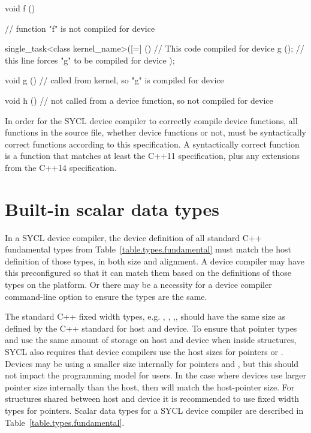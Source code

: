 \begin{code}
void f ()
{
    // function "f" is not compiled for device

    single_task<class kernel_name>([=] ()
        {
            // This code compiled for device
            g (); // this line forces "g" to be compiled for device
        });
}

void g ()
{
    // called from kernel, so "g" is compiled for device
}

void h ()
{
    // not called from a device function, so not compiled for device
}
\end{code}

In order for the SYCL device compiler to correctly compile device functions, all
functions in the source file, whether device functions or not, must be
syntactically correct functions according to this specification. A syntactically
correct function is a function that matches at least the C++11 specification,
plus any extensions from the C++14 specification.

\section{Built-in scalar data types}
\label{subsection:scalartypes}
In a SYCL device compiler, the device definition of all standard C++ fundamental
types from Table~\ref{table.types.fundamental} must match the host definition of those types, in both
size and alignment. A device
compiler may have this preconfigured so that it can match them based on the
definitions of those types on the platform. Or there may be a necessity for a
device compiler command-line option to ensure the types are the same.

The standard C++ fixed width types, e.g. ,
, ,,
should have the same size as defined by the C++ standard for host and
device.
\ifx\showtodos\true
To ensure that pointer types and  use the same amount of
storage on host and device when inside structures, SYCL also requires that
device compilers use the host sizes for pointers or . Devices
may be using a smaller size internally for pointers and ,
but this should not impact the programming model for users. In the case where
devices use larger pointer size internally than the host, then
 will match the \gls{host-pointer} size. For structures shared
between host and device it is recommended to use fixed width types for pointers.
Scalar data types for a SYCL device compiler are described in
Table~\ref{table.types.fundamental}.
\fi

